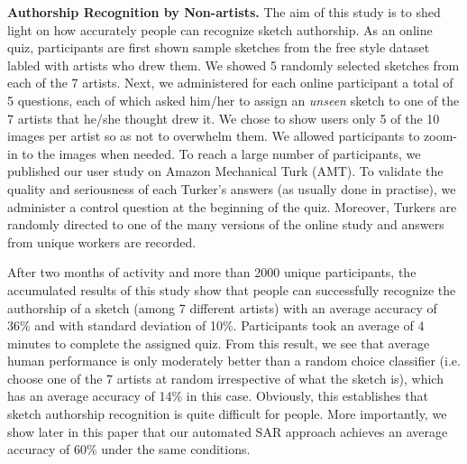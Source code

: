 \noindent\textbf{Authorship Recognition by Non-artists.} The aim of this study is to shed light on how accurately people can recognize sketch authorship. As an online quiz, participants are first shown sample sketches from the free style dataset labled with artists who drew them. We showed 5 randomly selected sketches from each of the 7 artists. Next, we administered for each online participant a total of 5 questions, each of which asked him/her to assign an \emph{unseen} sketch to one of the 7 artists that he/she thought drew it. We chose to show users only 5 of the 10 images per artist so as not to overwhelm them. We allowed participants to zoom-in to the images when needed. To reach a large number of participants, we published our user study on Amazon Mechanical Turk (AMT). To validate the quality and seriousness of each Turker's answers (as usually done in practise), we administer a control question at the beginning of the quiz. Moreover, Turkers are randomly directed to one of the many versions of the online study and answers from unique workers are recorded.

After two months of activity and more than 2000 unique participants, the accumulated results of this study show that people can successfully recognize the authorship of a sketch (among 7 different artists) with an average accuracy of 36\% and with standard deviation of 10\%. Participants took an average of 4 minutes to complete the assigned quiz. From this result, we see that average human performance is only moderately better than a random choice classifier (i.e. choose one of the 7 artists at random irrespective of what the sketch is), which has an average accuracy of 14\% in this case. Obviously, this establishes that sketch authorship recognition is quite difficult for people. More importantly, we show later in this paper that our automated SAR approach achieves an average accuracy of 60\% under the same conditions.



